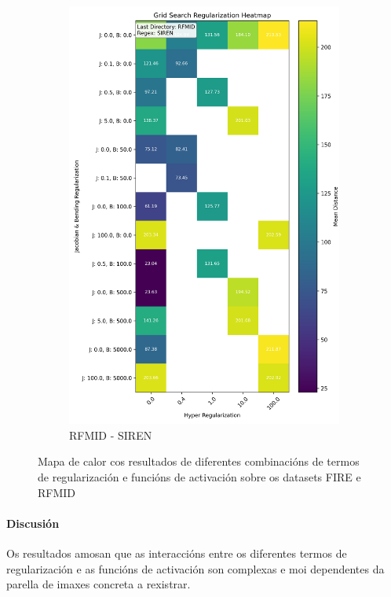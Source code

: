 \begin{figure}[ht]
\begin{subfigure}[b]{0.4\textwidth}
        \includegraphics[width=\textwidth]{imaxes/grid_search_single_heatmap_RFMID_SIREN.png}
        \caption{RFMID - SIREN}
        \label{fig:gs_single_RFMID_SIREN}
    \end{subfigure}
    
    \caption{Mapa de calor cos resultados de diferentes combinacións de termos de regularización e funcións de activación sobre os datasets FIRE e RFMID}
    \label{fig:gs_single_heatmaps}
\end{figure}

\paragraph{Discusión}
\label{par:Discusion-reg2}

Os resultados amosan que as interaccións entre os diferentes termos de regularización e as funcións de activación son complexas e moi dependentes da parella de imaxes concreta a rexistrar.

\FloatBarrier